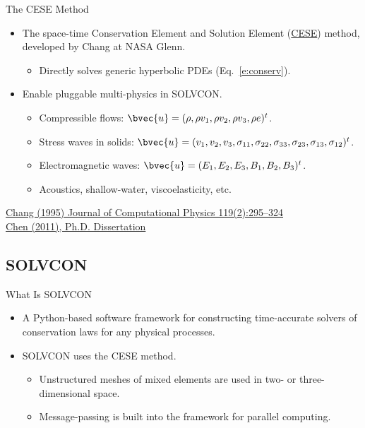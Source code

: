 \documentclass[dvips,xcolor=pst,14pt]{beamer}
\begin{document}
\begin{frame}{
%
The CESE Method
%
}
\begin{itemize}
  \item The space-time Conservation Element and Solution Element
  (\href{http://www.grc.nasa.gov/WWW/microbus/}{CESE}) method, developed by
  Chang at NASA Glenn.
  \begin{itemize}
    \item Directly solves generic hyperbolic PDEs (Eq.~\eqref{e:conserv}).
  \end{itemize}
  \item Enable pluggable multi-physics in SOLVCON.
  \begin{itemize}
    \item Compressible flows: $\bvec{u} = (\rho, \rho v_1, \rho v_2, \rho v_3,
    \rho e)^t$.
    \item Stress waves in solids: $\bvec{u} = (v_1, v_2, v_3, \sigma_{11},
    \sigma_{22}, \sigma_{33}, \sigma_{23}, \sigma_{13}, \sigma_{12})^t$.
    \item Electromagnetic waves: $\bvec{u} = (E_1, E_2, E_3, B_1, B_2, B_3)^t$.
    \item Acoustics, shallow-water, viscoelasticity, etc.
  \end{itemize}
\end{itemize}

\begin{flushright}\footnotesize
\href{http://dx.doi.org/10.1006/jcph.1995.1137}{Chang (1995) Journal of
Computational Physics 119(2):295--324} \\
\href{http://solvcon.net/yyc/publications.html}{Chen (2011), Ph.D. Dissertation}
\end{flushright}

\end{frame}

\subsection{
SOLVCON
}

\begin{frame}{
%
What Is SOLVCON
%
}
\begin{itemize}
  \item A Python-based software framework for constructing time-accurate
  solvers of conservation laws for any physical processes.
  \item SOLVCON uses the CESE method.
  \begin{itemize}
    \item Unstructured meshes of mixed elements are used in two- or
    three-dimensional space.
    \item Message-passing is built into the framework for parallel computing.
  \end{itemize}
\end{itemize}
\end{frame}
\end{document}
